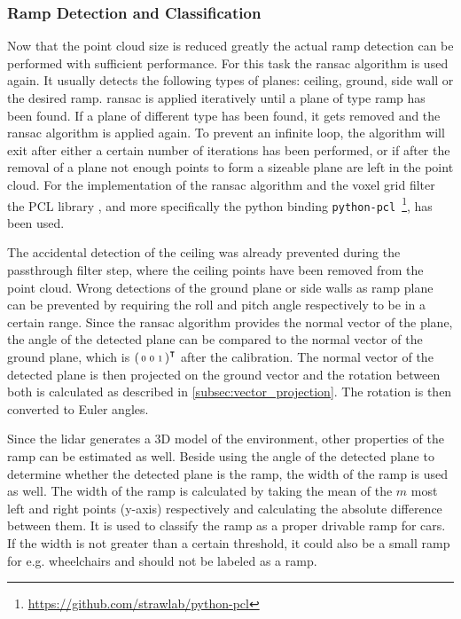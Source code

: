 \subsubsection{Ramp Detection and Classification}
\label{sssec:ramp_detecion_lidar}
Now that the point cloud size is reduced greatly the actual ramp detection can be performed with sufficient performance.
For this task the \gls{ransac} algorithm is used again.
It usually detects the following types of planes: ceiling, ground, side wall or the desired ramp.
\gls{ransac} is applied iteratively until a plane of type ramp has been found.
If a plane of different type has been found, it gets removed and the \gls{ransac} algorithm is applied again.
To prevent an infinite loop, the algorithm will exit after either a certain number of iterations has been performed, or if after the removal of a plane not enough points to form a sizeable plane are left in the point cloud.
For the implementation of the \gls{ransac} algorithm and the voxel grid filter the PCL library \cite{Rusu2011}, and more specifically the python binding \texttt{python-pcl}~\footnote{\url{https://github.com/strawlab/python-pcl}}, has been used.\par
The accidental detection of the ceiling was already prevented during the passthrough filter step, where the ceiling points have been removed from the point cloud.
Wrong detections of the ground plane or side walls as ramp plane can be prevented by requiring the roll and pitch angle respectively to be in a certain range.
Since the \gls{ransac} algorithm provides the normal vector of the plane, the angle of the detected plane can be compared to the normal vector of the ground plane, which is $\smqty(0 & 0 & 1)^\intercal$ after the calibration.
The normal vector of the detected plane is then projected on the ground vector and the rotation between both is calculated as described in \cref{subsec:vector_projection}.
The rotation is then converted to Euler angles.\par
Since the \gls{lidar} generates a 3D model of the environment, other properties of the ramp can be estimated as well.
Beside using the angle of the detected plane to determine whether the detected plane is the ramp, the width of the ramp is used as well.
The width of the ramp is calculated by taking the mean of the $m$ most left and right points (y-axis) respectively and calculating the absolute difference between them.
It is used to classify the ramp as a proper drivable ramp for cars.
If the width is not greater than a certain threshold, it could also be a small ramp for e.g. wheelchairs and should not be labeled as a ramp.
